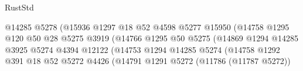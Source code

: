 \begin{lexlean}{RustStd}
\begin{coremodule}
                                                  @14285
                                                  @5278
                                                  (@15936
                                                    @1297
                                                    @18
                                                    @52
                                                    @4598
                                                    @5277
                                                    @15950
                                                    (@14758
                                                      @1295
                                                      @120
                                                      @50
                                                      @28
                                                      @5275
                                                      @3919
                                                      (@14766
                                                        @1295
                                                        @50
                                                        @5275
                                                        (@14869
                                                          @1294
                                                          @14285
                                                          @3925
                                                          @5274
                                                          @4394
                                                          @12122
                                                          (@14753
                                                            @1294
                                                            @14285
                                                            @5274
                                                            (@14758
                                                              @1292
                                                              @391
                                                              @18
                                                              @52
                                                              @5272
                                                              @4426
                                                              (@14791
                                                                @1291
                                                                @5272
                                                                (@11786 (@11787 @5272))

\end{coremodule}
\end{lexlean}
